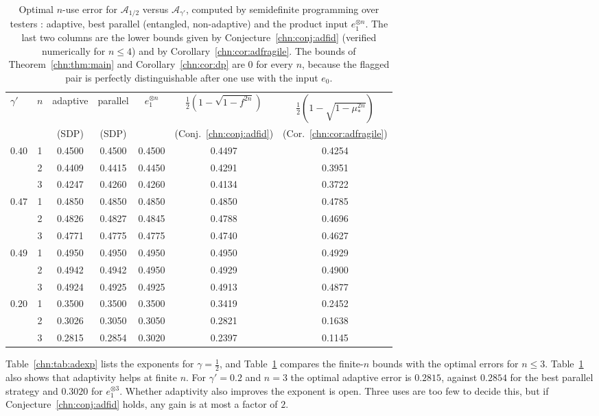 \begin{table}[!tbp]
\centering
\small
\begin{tabular}{lcccccc}
\toprule
$\gamma'$ & $n$ & adaptive & parallel & $e_1^{\otimes n}$ & $\tfrac12(1-\sqrt{1-f^{2n}})$ & $\tfrac12(1-\sqrt{1-\mu_*^{2n}})$\\
 & & (SDP) & (SDP) & & (Conj.~\ref{chn:conj:adfid}) & (Cor.~\ref{chn:cor:adfragile})\\
\midrule
$0.40$ & 1 & 0.4500 & 0.4500 & 0.4500 & 0.4497 & 0.4254\\
 & 2 & 0.4409 & 0.4415 & 0.4450 & 0.4291 & 0.3951\\
 & 3 & 0.4247 & 0.4260 & 0.4260 & 0.4134 & 0.3722\\
\addlinespace
$0.47$ & 1 & 0.4850 & 0.4850 & 0.4850 & 0.4850 & 0.4785\\
 & 2 & 0.4826 & 0.4827 & 0.4845 & 0.4788 & 0.4696\\
 & 3 & 0.4771 & 0.4775 & 0.4775 & 0.4740 & 0.4627\\
\addlinespace
$0.49$ & 1 & 0.4950 & 0.4950 & 0.4950 & 0.4950 & 0.4929\\
 & 2 & 0.4942 & 0.4942 & 0.4950 & 0.4929 & 0.4900\\
 & 3 & 0.4924 & 0.4925 & 0.4925 & 0.4913 & 0.4877\\
\addlinespace
$0.20$ & 1 & 0.3500 & 0.3500 & 0.3500 & 0.3419 & 0.2452\\
 & 2 & 0.3026 & 0.3050 & 0.3050 & 0.2821 & 0.1638\\
 & 3 & 0.2815 & 0.2854 & 0.3020 & 0.2397 & 0.1145\\
\bottomrule
\end{tabular}
\caption{Optimal $n$-use error for $\mathcal A_{1/2}$ versus $\mathcal A_{\gamma'}$, computed by semidefinite programming over testers \cite{GutoskiWatrous2007,ChiribellaDArianoPerinotti2009}: adaptive, best parallel (entangled, non-adaptive) and the product input $e_1^{\otimes n}$. The last two columns are the lower bounds given by Conjecture~\ref{chn:conj:adfid} (verified numerically for $n\le4$) and by Corollary~\ref{chn:cor:adfragile}. The bounds of Theorem~\ref{chn:thm:main} and Corollary~\ref{chn:cor:dp} are $0$ for every $n$, because the flagged pair is perfectly distinguishable after one use with the input $e_0$.}
\label{chn:tab:adfin}
\end{table}

Table~\ref{chn:tab:adexp} lists the exponents for $\gamma=\frac12$, and Table~\ref{chn:tab:adfin} compares the finite-$n$ bounds with the optimal errors for $n\le3$. Table~\ref{chn:tab:adfin} also shows that adaptivity helps at finite $n$. For $\gamma'=0.2$ and $n=3$ the optimal adaptive error is $0.2815$, against $0.2854$ for the best parallel strategy and $0.3020$ for $e_1^{\otimes3}$. Whether adaptivity also improves the exponent is open. Three uses are too few to decide this, but if Conjecture~\ref{chn:conj:adfid} holds, any gain is at most a factor of $2$.


